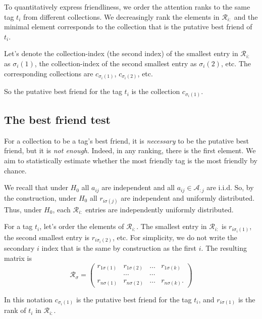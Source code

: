 \documentclass{llncs}
\begin{document}
To quantitatively express friendliness, we order the attention ranks to the same tag $t_i$ from different collections. We decreasingly rank the elements in $\mathcal{R}_{i:}$ and the minimal element
corresponds to the collection that is the putative best friend of $t_i$.

Let's denote the collection-index (the second index) of the smallest entry in $\mathcal{R}_{i:}$ as $\sigma_i(1)$, the collection-index of the second smallest entry as ${\sigma_i(2)}$, etc. The corresponding collections are $c_{\sigma_{i}(1)}$, $c_{\sigma_{i}(2)}$, etc. 

So the putative best friend for the tag $t_i$ is the collection $c_{\sigma_{i}(1)}$.

\subsection{The best friend test}
\label{sec:best_friend_test}

For a collection to be a tag's best friend, it is \textit{necessary} to be the putative best friend, but it is \textit{not enough}. Indeed, in any ranking, there is the first element. We aim to statistically estimate whether the most friendly tag is the most friendly by chance. 

We recall that under $H_0$ all $a_{ij}$ are independent and all $a_{ij} \in \mathcal{A}_{:j}$ are i.i.d. So, by the construction, under $H_0$ all $r_{i\sigma(j)}$ are independent and uniformly distributed.
Thus, under $H_0$, each $\mathcal{R}_{i:}$ entries are independently uniformly distributed. 

For a tag $t_i$, let's order the elements of $\mathcal{R}_{i:}$. The smallest entry in $\mathcal{R}_{i:}$ is $r_{i\sigma_i(1)}$, the second smallest entry is $r_{i\sigma_i(2)}$, etc. For simplicity, we do not write the secondary $i$ index that is the same by construction as the first $i$. The resulting matrix is 
\begin{equation}
\label{def:R_sigma}
\mathcal{R}_{\sigma} = \begin{pmatrix}
r_{1\sigma(1)} & r_{1\sigma(2)} & \dots & r_{1\sigma(k)} \\
       &\cdots & \cdots &  \\
r_{n\sigma(1)} & r_{n\sigma(2)} & \dots & r_{n\sigma(k)}.
\end{pmatrix}
\end{equation}

In this notation $c_{\sigma_i(1)}$ is the putative best friend for the tag $t_i$, and $r_{i\sigma(1)}$ is the rank of $t_i$ in $\mathcal{R}_{i:}$. 
\end{document}
